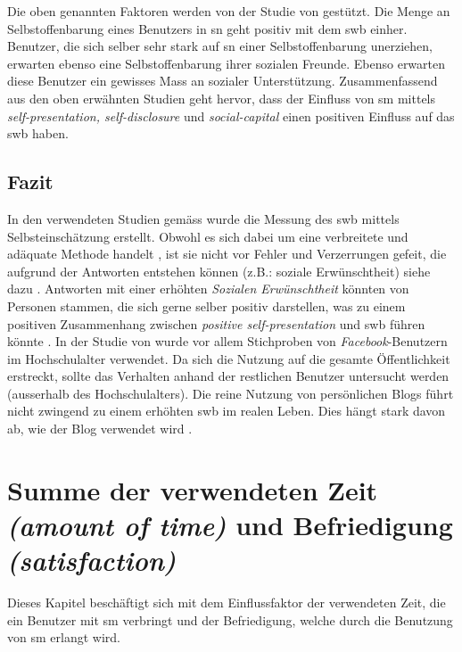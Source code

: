 Die oben genannten Faktoren werden von der Studie von  gestützt. Die Menge an Selbstoffenbarung eines Benutzers in \gls{sn} geht positiv mit dem \gls{swb} einher. Benutzer, die sich selber sehr stark auf \gls{sn} einer Selbstoffenbarung unerziehen, erwarten ebenso eine Selbstoffenbarung ihrer sozialen Freunde. Ebenso erwarten diese Benutzer ein gewisses Mass an sozialer Unterstützung.\newline
Zusammenfassend aus den oben erwähnten Studien geht hervor, dass der Einfluss von \gls{sm} mittels \textit{self-presentation, self-disclosure} und \textit{social-capital} einen positiven Einfluss auf das \gls{swb} haben.

\subsection{Fazit}\label{subsec.selfpFazit}
In den verwendeten Studien gemäss  wurde die Messung des \gls{swb} mittels Selbsteinschätzung erstellt. Obwohl es sich dabei um eine verbreitete und adäquate Methode handelt \cite{Diener:2005}, ist sie nicht vor Fehler und Verzerrungen gefeit, die aufgrund der Antworten entstehen können (z.B.: soziale Erwünschtheit) siehe dazu . Antworten mit einer erhöhten \textit{Sozialen Erwünschtheit} könnten von Personen stammen, die sich gerne selber positiv darstellen, was zu einem positiven Zusammenhang zwischen \textit{positive self-presentation} und \gls{swb} führen könnte \cite{Diener:1991}.\newline
In der Studie von  wurde vor allem Stichproben von \textit{Facebook}-Benutzern im Hochschulalter verwendet. Da sich die Nutzung auf die gesamte Öffentlichkeit erstreckt, sollte das Verhalten anhand der restlichen Benutzer untersucht werden (ausserhalb des Hochschulalters).\newline
Die reine Nutzung von persönlichen Blogs führt nicht zwingend zu einem erhöhten \gls{swb} im realen Leben. Dies hängt stark davon ab, wie der Blog verwendet wird \cite{Jung:2012}.

\section{Summe der verwendeten Zeit \textit{(amount of time)} und Befriedigung \textit{(satisfaction)}}\label{sub.amount}
Dieses Kapitel beschäftigt sich mit dem Einflussfaktor der verwendeten Zeit, die ein Benutzer mit \gls{sm} verbringt und der Befriedigung, welche durch die Benutzung von \gls{sm} erlangt wird. 

